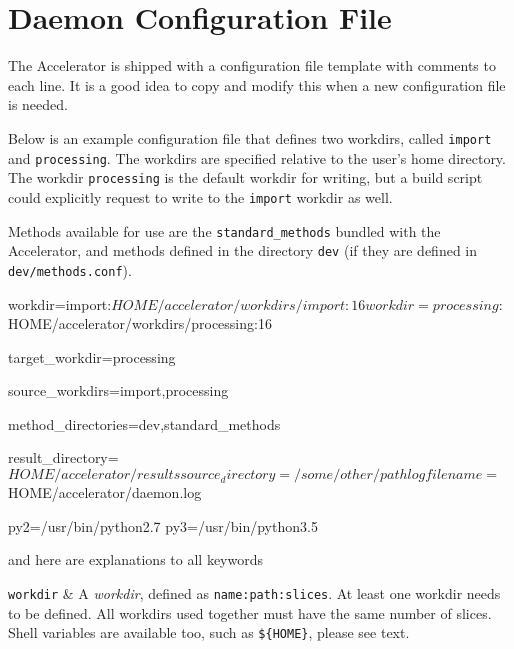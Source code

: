 

\section{Daemon Configuration File}
\label{sec:configfile}

The Accelerator is shipped with a configuration file template with
comments to each line.  It is a good idea to copy and modify this when
a new configuration file is needed.

Below is an example configuration file that defines two workdirs,
called \texttt{import} and
\texttt{processing}.  The workdirs are specified relative to the user's
home directory.  The workdir \texttt{processing} is the default workdir
for writing, but a build script could explicitly request to write to
the \texttt{import} workdir as well.

Methods available for use are the \texttt{standard\_methods} bundled
with the Accelerator, and methods defined in the
directory \texttt{dev} (if they are defined in \texttt{dev/methods.conf}).
\begin{shell}
workdir=import:${HOME}/accelerator/workdirs/import:16
workdir=processing:${HOME}/accelerator/workdirs/processing:16

target_workdir=processing

source_workdirs=import,processing

method_directories=dev,standard_methods

result_directory=${HOME}/accelerator/results

source_directory=/some/other/path

logfilename=${HOME}/accelerator/daemon.log

py2=/usr/bin/python2.7
py3=/usr/bin/python3.5
\end{shell}
\noindent and here are explanations to all keywords
\starttabletwo

\RPtwo \texttt{workdir} & A \textsl{workdir}, defined as
\texttt{name:path:slices}.  At least one workdir needs to be defined.
All workdirs used together must have the same number of slices.  Shell
variables are available too, such as \texttt{\$\{HOME\}}, please see
text.\\[1ex]

